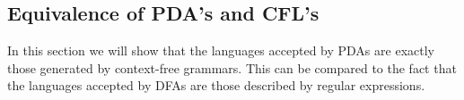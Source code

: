 

\setcounter{section}{6}
\setcounter{subsection}{4}
\setcounter{dfn}{9}

\subsection{Equivalence of PDA's and CFL's}
In this section we will show that the languages accepted by PDAs are exactly those generated by context-free grammars.
This can be compared to the fact that the languages accepted by DFAs are those described by regular expressions.


